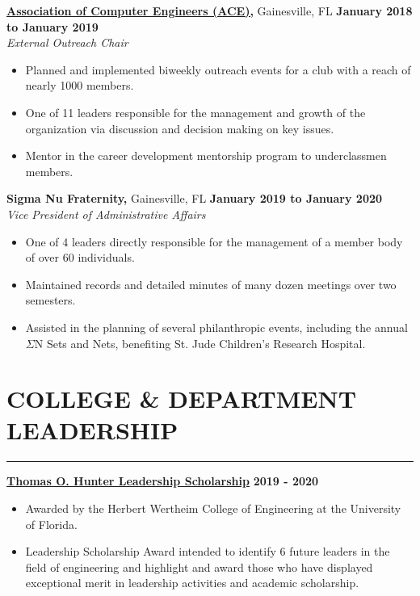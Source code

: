 \documentclass[11pt]{article} %
\begin{document}
		\noindent \href{https://uf-ace.com/}{\textbf{Association of Computer Engineers (ACE),}} Gainesville, FL \hfill\textbf{January 2018 to January 2019}\\
		\textit{External Outreach Chair}
		\begin{itemize}[noitemsep,nolistsep, label={-}]
			\item Planned and implemented biweekly outreach events for a club with a reach of nearly 1000 members.
			\item One of 11 leaders responsible for the management and growth of the organization via discussion and decision making on key issues.
			\item Mentor in the career development mentorship program to underclassmen members.
		\end{itemize}
		\vspace{.20cm}
		
		\noindent \textbf{Sigma Nu Fraternity,} Gainesville, FL \hfill\textbf{January 2019 to January 2020}\\
		\textit{Vice President of Administrative Affairs}
		\begin{itemize}[noitemsep,nolistsep, label={-}]
			\item One of 4 leaders directly responsible for the management of a member body of over 60 individuals.
			\item Maintained records and detailed minutes of many dozen meetings over two semesters.
			\item Assisted in the planning of several philanthropic events, including the annual $\Sigma$N Sets and Nets, benefiting St. Jude Children's Research Hospital.
		\end{itemize}
		\vspace{.20cm}
	
	\section*{COLLEGE \& DEPARTMENT LEADERSHIP}
	\hrule \relax
	\vspace{.4cm}
	
	\noindent\textbf{\href{https://www.eng.ufl.edu/leadership/students/scholarships/thomas-o-hunter-leadership/}{Thomas O. Hunter Leadership Scholarship}} \hfill\textbf{2019 - 2020}
	\begin{itemize}[noitemsep,nolistsep, label={-}]
		\item Awarded by the Herbert Wertheim College of Engineering at the University of Florida.
		\item Leadership Scholarship Award intended to identify 6 future leaders in the field of engineering and highlight and award those who have displayed exceptional merit in leadership activities and academic scholarship.
	\end{itemize}
	\vspace{.20cm}
	
\end{document}
